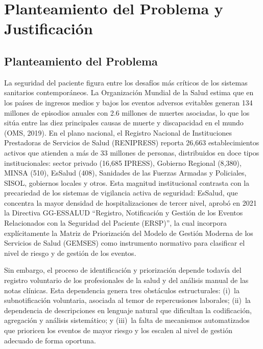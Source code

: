 \documentclass[12pt,a4paper,oneside]{book}
\begin{document}
\singlespacing
\tableofcontents
\onehalfspacing

\chapter{Planteamiento del Problema y Justificación}

\section{Planteamiento del Problema}

La seguridad del paciente figura entre los desafíos más críticos de los sistemas sanitarios contemporáneos. La Organización Mundial de la Salud estima que en los países de ingresos medios y bajos los eventos adversos evitables generan 134 millones de episodios anuales con 2.6 millones de muertes asociadas, lo que los sitúa entre las diez principales causas de muerte y discapacidad en el mundo (OMS, 2019). En el plano nacional, el Registro Nacional de Instituciones Prestadoras de Servicios de Salud (RENIPRESS) reporta 26{,}663 establecimientos activos que atienden a más de 33 millones de personas, distribuidos en doce tipos institucionales: sector privado (16{,}685 IPRESS), Gobierno Regional (8{,}380), MINSA (510), EsSalud (408), Sanidades de las Fuerzas Armadas y Policiales, SISOL, gobiernos locales y otros. Esta magnitud institucional contrasta con la precariedad de los sistemas de vigilancia activa de seguridad: EsSalud, que concentra la mayor densidad de hospitalizaciones de tercer nivel, aprobó en 2021 la Directiva GG-ESSALUD ``Registro, Notificación y Gestión de los Eventos Relacionados con la Seguridad del Paciente (ERSP)'', la cual incorpora explícitamente la Matriz de Priorización del Modelo de Gestión Moderna de los Servicios de Salud (GEMSES) como instrumento normativo para clasificar el nivel de riesgo y de gestión de los eventos.

Sin embargo, el proceso de identificación y priorización depende todavía del registro voluntario de los profesionales de la salud y del análisis manual de las notas clínicas. Esta dependencia genera tres obstáculos estructurales: (i)~la subnotificación voluntaria, asociada al temor de repercusiones laborales; (ii)~la dependencia de descripciones en lenguaje natural que dificultan la codificación, agregación y análisis sistemático; y (iii)~la falta de mecanismos automatizados que prioricen los eventos de mayor riesgo y los escalen al nivel de gestión adecuado de forma oportuna.
\end{document}
